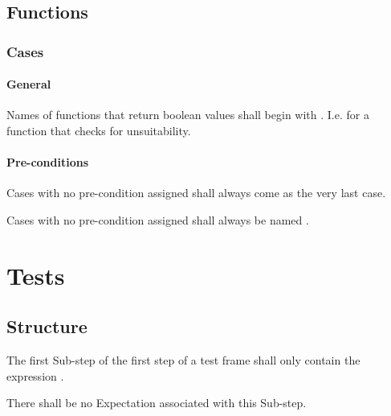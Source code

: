 \documentclass[draft]{efsguide}
\begin{document}
\section{Functions}
\subsection{Cases}

\subsubsection{General}
\begin{rules}
\item \deleted
\item \deleted
\item \label{rule:function_naming}Names of functions that return boolean values shall begin with . I.e.  for a function that checks for unsuitability. 
\end{rules}

\subsubsection{Pre-conditions}
\begin{rules}
\item Cases with no pre-condition assigned shall always come as the very last case. 
\item Cases with no pre-condition assigned shall always be named . 
\end{rules}

\chapter{Tests}

\section{Structure}
\begin{rules}
\item \deleted
\item The first Sub-step of the first step of a test frame shall only contain the expression . 
\begin{rules}
\item There shall be no Expectation associated with this Sub-step. 
\end{rules}
\end{rules}
\end{document}
